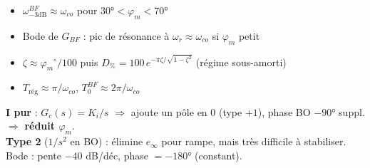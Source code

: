 \begin{tcolorbox}[colback=ch6teal!5,colframe=ch6teal!80!black,title={Correspondance BO $\to$ BF : r\`egles de pouce}]
\begin{itemize}
  \item $\omega_{-3\text{dB}}^{BF} \approx \omega_{co}$ pour $30° < \varphi_m < 70°$
  \item Bode de $G_{BF}$ : pic de r\'esonance \`a $\omega_r \approx \omega_{co}$ si $\varphi_m$ petit
  \item $\zeta \approx \varphi_m\!{}^\circ/100$ puis $D_\% = 100\,e^{-\pi\zeta/\sqrt{1-\zeta^2}}$ (r\'egime sous-amorti)
  \item $T_{\text{r\'eg}} \approx \pi/\omega_{co}$, \quad $T_0^{BF} \approx 2\pi/\omega_{co}$
\end{itemize}
\end{tcolorbox}

\begin{tcolorbox}[colback=ch6teal!5,colframe=ch6teal!80!black,title={R\'egulateur I pur \& double int\'egrateur en BO}]
\textbf{I pur} : $G_c(s) = K_i/s$ $\Rightarrow$ ajoute un p\^ole en 0 (type $+1$), phase BO $-90°$ suppl. $\Rightarrow$ \textbf{r\'eduit $\varphi_m$}.\\[2pt]
\textbf{Type 2} ($1/s^2$ en BO) : \'elimine $e_\infty$ pour rampe, mais tr\`es difficile \`a stabiliser. Bode : pente $-40$ dB/d\'ec, phase $= -180°$ (constant). \\[2pt]
\end{tcolorbox}

